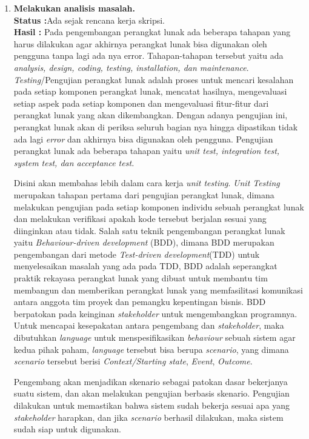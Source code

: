 \documentclass[a4paper,twoside]{article}
\begin{document}
\begin{enumerate}
		\item \textbf{Melakukan analisis masalah.}\\
		\textbf{Status :}Ada sejak rencana kerja skripsi.\\
		\textbf{Hasil :} Pada pengembangan perangkat lunak ada beberapa tahapan yang harus dilakukan agar akhirnya perangkat lunak bisa digunakan oleh pengguna tanpa lagi ada nya error. Tahapan-tahapan tersebut yaitu ada \textit{analysis, design, coding, testing, installation, dan maintenance}. \textit{Testing}/Pengujian perangkat lunak adalah proses untuk mencari kesalahan pada setiap komponen perangkat lunak, mencatat hasilnya, mengevaluasi setiap aspek pada setiap komponen dan mengevaluasi fitur-fitur dari perangkat lunak yang akan dikembangkan. Dengan adanya pengujian ini, perangkat lunak akan di periksa seluruh bagian nya hingga dipastikan tidak ada lagi \textit{error} dan akhirnya bisa digunakan oleh pengguna. Pengujian perangkat lunak ada beberapa tahapan yaitu \textit{unit test, integration test, system test, dan acceptance test.}
		
		Disini akan membahas lebih dalam cara kerja \textit{unit testing}. \textit{Unit Testing} merupakan tahapan pertama dari pengujian perangkat lunak, dimana melakukan pengujian pada setiap komponen individu sebuah perangkat lunak dan melakukan verifikasi apakah kode tersebut berjalan sesuai yang diinginkan atau tidak. Salah satu teknik pengembangan perangkat lunak yaitu \textit{Behaviour-driven development} (BDD), dimana BDD merupakan pengembangan dari metode \textit{Test-driven development}(TDD) untuk menyelesaikan masalah yang ada pada TDD, BDD adalah seperangkat praktik rekayasa perangkat lunak yang dibuat untuk membantu tim membangun dan memberikan perangkat lunak yang memfasilitasi komunikasi antara anggota tim proyek dan pemangku kepentingan bisnis. BDD berpatokan pada keinginan \textit{stakeholder} untuk mengembangkan programnya. Untuk mencapai kesepakatan antara pengembang dan \textit{stakeholder}, maka dibutuhkan \textit{language} untuk menspesifikasikan \textit{behaviour} sebuah sistem agar kedua pihak paham, \textit{language} tersebut bisa berupa \textit{scenario}, yang dimana \textit{scenario} tersebut berisi \textit{Context/Starting state}, \textit{Event}, \textit{Outcome}.
		
		Pengembang akan menjadikan skenario sebagai patokan dasar bekerjanya suatu sistem, dan akan melakukan pengujian berbasis skenario. Pengujian dilakukan untuk memastikan bahwa sistem sudah bekerja sesuai apa yang \textit{stakeholder} harapkan, dan jika \textit{scenario} berhasil dilakukan, maka sistem sudah siap untuk digunakan.
		

\end{enumerate}
\end{document}
